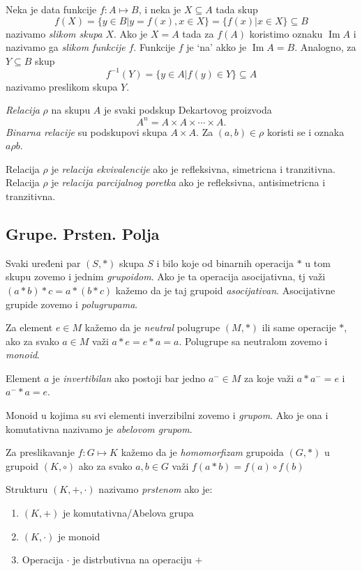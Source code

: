 \documentclass[12p,a4paper]{article}
\DeclareMathOperator{\Ima}{Im}
\begin{document}
\begin{multicols}{2}
    Neka je data funkcije $f : A \mapsto B$, i neka je $X \subseteq A$ tada 
    skup
    \[f(X) = \{y \in B | y = f(x), x \in X\} = 
    \{f(x) | x \in X\} \subseteq B\]
    nazivamo \textit{slikom skupa} $X$. Ako je $X = A$ tada za $f(A)$ 
    koristimo oznaku $\Ima A$ i nazivamo ga \textit{slikom funkcije} $f$.
    Funkcije $f$ je `na' akko je $\Ima A = B$. Analogno, za $Y \subseteq B$ 
    skup
    \[f^{-1}(Y) = \{y \in A | f(y) \in Y\} \subseteq A\]
    nazivamo preslikom skupa $Y$.

    \textit{Relacija} $\rho$ na skupu $A$ je svaki podskup Dekartovog proizvoda
    \[A^n = A \times A \times \cdots \times A.\]
    \textit{Binarna relacije} su podskupovi skupa $A \times A$. 
    Za $(a, b) \in \rho$ koristi se i oznaka $a \rho b$.

    Relacija $\rho$ je \textit{relacija ekvivalencije} 
    ako je refleksivna, simetricna i tranzitivna. 
    Relacija $\rho$ je \textit{relacija parcijalnog poretka} 
    ako je refleksivna, antisimetricna i tranzitivna.

\subsection{Grupe. Prsten. Polja}

    Svaki uređeni par $(S, *)$ skupa $S$ i bilo koje od binarnih operacija $*$ 
    u tom skupu zovemo i jednim \textit{grupoidom}. Ako je ta operacija 
    asocijativna, tj važi $(a * b) * c = a * (b * c)$ kažemo da je taj grupoid 
    \textit{asocijativan}. Asocijativne grupide zovemo i \textit{polugrupama}.

    Za element $e \in M$ kažemo da je \textit{neutral} polugrupe $(M, *)$ ili 
    same operacije $*$, ako za svako $a \in M$ važi $a * e = e * a = a$. 
    Polugrupe sa neutralom zovemo i \textit{monoid}.

    Element $a$ je \textit{invertibilan} ako postoji bar jedno $a^- \in M$ za 
    koje važi $a * a^- = e$ i $a^- * a = e$.

    Monoid u kojima su svi elementi inverzibilni zovemo i \textit{grupom}. 
    Ako je ona i komutativna nazivamo je \textit{abelovom grupom}.

    Za preslikavanje $f : G \mapsto K$ kažemo da je \textit{homomorfizam} 
    grupoida $(G, *)$ u grupoid $(K, \circ)$ ako za svako $a, b \in G$ važi 
    $f(a * b) = f(a) \circ f(b)$

    Strukturu $(K, +, \cdot)$ nazivamo \textit{prstenom} ako je:
    \begin{enumerate}
        \itemsep0em
        \item $(K, +)$ je komutativna/Abelova grupa 
        \item $(K, \cdot)$ je monoid
        \item Operacija $\cdot$ je distrbutivna na operaciju $+$
    \end{enumerate}


\end{multicols}
\end{document}
